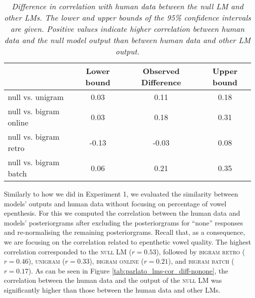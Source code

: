 {%
\begin{table}[ht]
\centering
\caption{\textit{Difference in correlation with human data between the null LM and other LMs. The lower and upper bounds of the 95\% confidence intervals are given. Positive values indicate higher correlation between human data and the null model output than between human data and other LM output.}}
\label{tab:parlato_lms-cor_diff}
\vspace{0.25cm}
\begin{tabular}{lccc}
   \toprule
  & Lower bound & Observed Difference & Upper bound \\  \midrule
null vs. unigram & 0.03 & 0.11 & 0.18 \\ 
null vs. bigram online  & 0.03 & 0.18 & 0.31 \\ 
null vs. bigram retro & -0.13 & -0.03 & 0.08 \\ 
null vs. bigram batch & 0.06 & 0.21 & 0.35 \\  \bottomrule 
\end{tabular}
\end{table}

Similarly to how we did in Experiment 1, we evaluated the similarity between models' outputs and human data without focusing on percentage of vowel epenthesis. For this we computed the correlation between the human data and models' posteriorgrams after excluding the posteriorgrams for ``none'' responses and re-normalising the remaining posteriorgrams. Recall that, as a consequence, we are focusing on the correlation related to epenthetic vowel quality. The highest correlation corresponded to the \textsc{null} LM ($r = 0.53$), followed by \textsc{bigram retro} ($r = 0.46$), \textsc{unigram} ($r = 0.33$), \textsc{bigram online} ($r = 0.21$), and \textsc{bigram batch} ($r = 0.17$). 
As can be seen in Figure \ref{tab:parlato_lms-cor_diff-nonone}, the correlation between the human data and the output of the \textsc{null} LM was significantly higher than those between the human data and other LMs. 

}
